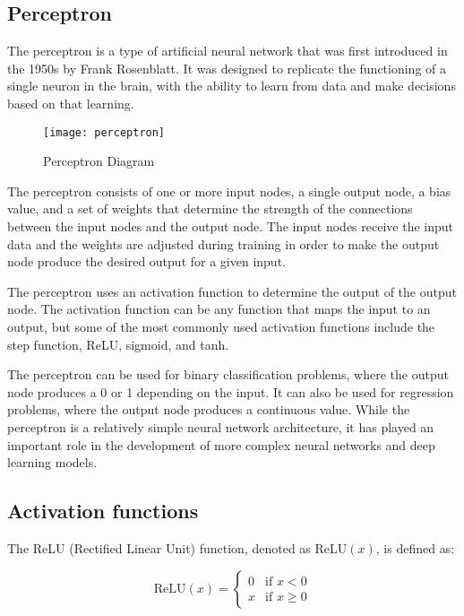 \subsection{Perceptron}

The perceptron \cite{rosenblatt1958perceptron} is a type of artificial neural network that was first introduced in the 1950s by Frank Rosenblatt.
It was designed to replicate the functioning of a single neuron in the brain, with the ability to learn from data and make decisions based on that learning.

\begin{figure}[H]
  \centering
  \texttt{[image: perceptron]}
  \caption{Perceptron Diagram \cite{Bhattacharyya}}
\end{figure}

The perceptron consists of one or more input nodes, a single output node, a bias value, and a set of weights that determine the strength of the connections between the input nodes and the output node.
The input nodes receive the input data and the weights are adjusted during training in order to make the output node produce the desired output for a given input.

The perceptron uses an activation function to determine the output of the output node. 
The activation function can be any function that maps the input to an output, but some of the most commonly used activation functions include the step function, ReLU, sigmoid, and tanh.

The perceptron can be used for binary classification problems, where the output node produces a 0 or 1 depending on the input.
It can also be used for regression problems, where the output node produces a continuous value. 
While the perceptron is a relatively simple neural network architecture, it has played an important role in the development of more complex neural networks and deep learning models.

\subsection{Activation functions}

The ReLU (Rectified Linear Unit) function, denoted as $\text{ReLU}(x)$, is defined as:

\begin{equation}
  \text{ReLU}(x) = \begin{cases}
    0 & \text{if } x < 0 \\
    x & \text{if } x \geq 0
  \end{cases}
\end{equation}

